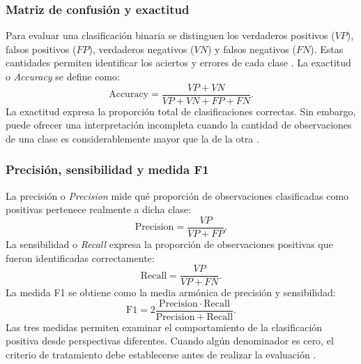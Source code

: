 \subsubsection{Matriz de confusión y exactitud}
Para evaluar una clasificación binaria se distinguen los verdaderos positivos ($VP$), falsos positivos ($FP$), verdaderos negativos ($VN$) y falsos negativos ($FN$). Estas cantidades permiten identificar los aciertos y errores de cada clase \cite{fawcett2006roc}. La exactitud o \textit{Accuracy} se define como:
\begin{equation}
\mathrm{Accuracy}=\frac{VP+VN}{VP+VN+FP+FN}.
\end{equation}
La exactitud expresa la proporción total de clasificaciones correctas. Sin embargo, puede ofrecer una interpretación incompleta cuando la cantidad de observaciones de una clase es considerablemente mayor que la de la otra \cite{saito2015precisionrecall}.

\subsubsection{Precisión, sensibilidad y medida F1}
La precisión o \textit{Precision} mide qué proporción de observaciones clasificadas como positivas pertenece realmente a dicha clase:
\begin{equation}
\mathrm{Precision}=\frac{VP}{VP+FP}.
\end{equation}
La sensibilidad o \textit{Recall} expresa la proporción de observaciones positivas que fueron identificadas correctamente:
\begin{equation}
\mathrm{Recall}=\frac{VP}{VP+FN}.
\end{equation}
La medida F1 se obtiene como la media armónica de precisión y sensibilidad:
\begin{equation}
\mathrm{F1}=2\frac{\mathrm{Precision}\cdot\mathrm{Recall}}
{\mathrm{Precision}+\mathrm{Recall}}.
\end{equation}
Las tres medidas permiten examinar el comportamiento de la clasificación positiva desde perspectivas diferentes. Cuando algún denominador es cero, el criterio de tratamiento debe establecerse antes de realizar la evaluación \cite{saito2015precisionrecall,hastie2009elements}.

